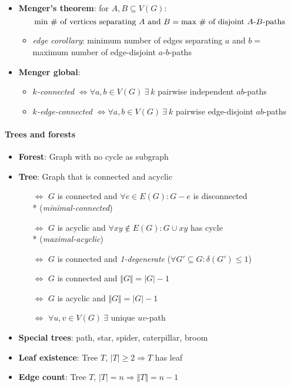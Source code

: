 \begin{itemize}
  \item \textbf{Menger's theorem}: for $ A,B \subseteq V(G) $:
    \begin{equation*}
      \text{min \# of vertices separating $ A $ and $ B $} = \text{max \# of disjoint $ A $-$ B $-paths}
    \end{equation*}
  \begin{itemize}
    \item \emph{edge corollary}: minimum number of edges separating $ a $ and $ b = $ maximum number of edge-disjoint $ a $-$ b $-paths 
  \end{itemize}
  \item \textbf{Menger global}:
    \begin{itemize}
      \item \emph{$ k $-connected} $ \Leftrightarrow \forall a,b \in V(G) \ \exists \ k $ pairwise independent $ ab $-paths
      \item \emph{$ k $-edge-connected} $ \Leftrightarrow \forall a,b \in V(G) \ \exists \ k $ pairwise edge-disjoint $ ab $-paths 
    \end{itemize}
\end{itemize}

\paragraph{Trees and forests}
\begin{itemize}
  \item \textbf{Forest}: Graph with no cycle as subgraph
  \item \textbf{Tree}: Graph that is connected and acyclic
  \begin{itemize}
    \item[$ \Leftrightarrow $] $ G $ is connected and $ \forall e \in E(G): G-e $ is disconnected \\* (\emph{minimal-connected})
    \item[$ \Leftrightarrow $] $ G $ is acyclic and $ \forall xy \not \in E(G) : G \cup xy $ has cycle \\* (\emph{maximal-acyclic})
    \item[$ \Leftrightarrow $] $ G $ is connected and \emph{1-degenerate} ($ \forall G' \subseteq G : \delta(G') \leq 1 $) 
    \item[$ \Leftrightarrow $] $ G $ is connected and $ \Vert G \Vert = \vert G \vert - 1 $
    \item[$ \Leftrightarrow $] $ G $ is acyclic and $ \Vert G \Vert = \vert G \vert - 1 $
    \item[$ \Leftrightarrow $] $ \forall u,v \in V(G) \ \exists $ unique $ uv $-path
  \end{itemize}
  \item \textbf{Special trees}: path, star, spider, caterpillar, broom
  \item \textbf{Leaf existence}: Tree $ T $, $ \vert T \vert \geq 2 \Rightarrow T $ has leaf
  \item \textbf{Edge count}: Tree $ T $, $ \vert T \vert = n \Rightarrow \Vert T \Vert = n-1 $ 
\end{itemize}

